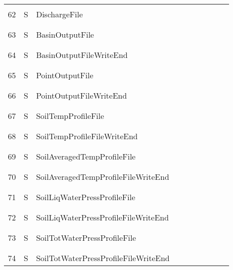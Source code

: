 \begin{longtable}{|c|c|l|c|c|c|c|p{}|c|p{}|}
&&&&&&&&&\\\hline%
&&&&&&&&&\\
62 & S & DischargeFile & & & & & & & \\
&&&&&&&&&\\\hline%
&&&&&&&&&\\
63 & S & BasinOutputFile & & & & & & & \\
&&&&&&&&&\\\hline%
&&&&&&&&&\\
64 & S & BasinOutputFileWriteEnd & & & & & & & \\
&&&&&&&&&\\\hline%
&&&&&&&&&\\
65 & S & PointOutputFile & & & & & & & \\
&&&&&&&&&\\\hline%
&&&&&&&&&\\
66 & S & PointOutputFileWriteEnd & & & & & & & \\
&&&&&&&&&\\\hline%
&&&&&&&&&\\
67 & S & SoilTempProfileFile & & & & & & & \\
&&&&&&&&&\\\hline%
&&&&&&&&&\\
68 & S & SoilTempProfileFileWriteEnd & & & & & & & \\
&&&&&&&&&\\\hline%
&&&&&&&&&\\
69 & S & SoilAveragedTempProfileFile & & & & & & & \\
&&&&&&&&&\\\hline%
&&&&&&&&&\\
70 & S & SoilAveragedTempProfileFileWriteEnd & & & & & & & \\
&&&&&&&&&\\\hline%
&&&&&&&&&\\
71 & S & SoilLiqWaterPressProfileFile & & & & & & & \\
&&&&&&&&&\\\hline%
&&&&&&&&&\\
72 & S & SoilLiqWaterPressProfileFileWriteEnd & & & & & & & \\
&&&&&&&&&\\\hline%
&&&&&&&&&\\
73 & S & SoilTotWaterPressProfileFile & & & & & & & \\
&&&&&&&&&\\\hline%
&&&&&&&&&\\
74 & S & SoilTotWaterPressProfileFileWriteEnd & & & & & & & \\

\end{longtable}
